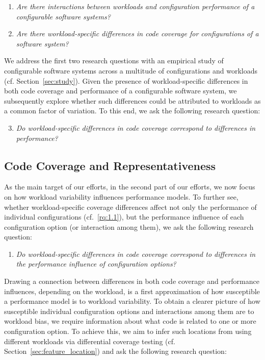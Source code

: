 \begin{enumerate}[align=left,label=RQ1.\arabic*]
	\item\textit{Are there interactions between workloads and configuration performance of a configurable software systems?}\label{rq:1.1}
	\item\textit{Are there workload-specific differences in code coverage for configurations of a software system?}\label{rq:1.2}
\end{enumerate}

We address the first two research questions with an empirical study of configurable software systems across a multitude of configurations and workloads (cf. Section~\ref{sec:study}). Given the presence of workload-specific differences in both code coverage and performance of a configurable software system, we subsequently explore whether such differences could be attributed to workloads as a common factor of variation. To this end, we ask the following research question:

\begin{enumerate}[align=left,label=RQ1.\arabic*]
	\setcounter{enumi}{2}
	\item\textit{Do workload-specific differences in code coverage correspond to differences in performance?}\label{rq:1.3}
\end{enumerate}

\subsection{Code Coverage and Representativeness}
As the main target of our efforts, in the second part of our efforts, we now focus on how workload variability influences performance models. To further see, whether workload-specific coverage differences affect not only the performance of individual configurations (cf.~\ref{rq:1.1}), but the performance influence of each configuration option (or interaction among them), we ask the following research question:

\begin{enumerate}[align=left,label=RQ2.\arabic*]
	\item\textit{Do workload-specific differences in code coverage correspond to differences in the performance influence of configuration options?}\label{rq:2.1}
\end{enumerate}

Drawing a connection between differences in both code coverage and performance influences, depending on the workload, is a first approximation of how susceptible a performance model is to workload variability. To obtain a clearer picture of how susceptible individual configuration options and interactions among them are to workload bias, we require information about what code is related to one or more configuration option. To achieve this, we aim to infer such locations from using different workloads via differential coverage testing (cf. Section~\ref{sec:feature_location}) and ask the following research question:

